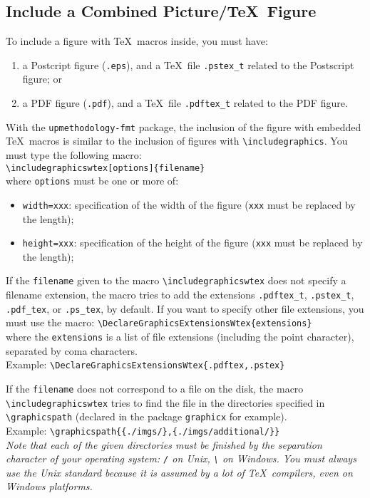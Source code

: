 \documentclass[book]{upmethodology-document}
\begin{document}
\subsection{Include a Combined Picture/\TeX\ Figure}

To include a figure with \TeX\ macros inside, you must have: \begin{enumerate}
\item a Postcript figure (\texttt{.eps}), and a \TeX\ file \texttt{.pstex\_t} related to the Postscript figure; or
\item a PDF figure (\texttt{.pdf}), and a \TeX\ file \texttt{.pdftex\_t} related to the PDF figure.
\end{enumerate}

With the \texttt{upmethodology-fmt} package, the inclusion of the figure with embedded \TeX\ macros is similar to the inclusion of figures with \texttt{{\textbackslash}includegraphics}. You must type the following macro: \\
\texttt{{\textbackslash}includegraphicswtex[options]\{filename\}} \\
where \texttt{options} must be one or more of: \begin{itemize}
\item \texttt{width=xxx}: specification of the width of the figure (\texttt{xxx} must be replaced by the length);
\item \texttt{height=xxx}: specification of the height of the figure (\texttt{xxx} must be replaced by the length);
\end{itemize}

If the \texttt{filename} given to the macro \texttt{{\textbackslash}includegraphicswtex} does not specify a filename extension, the macro tries to add the extensions \texttt{.pdftex\_t}, \texttt{.pstex\_t}, \texttt{.pdf\_tex}, or \texttt{.ps\_tex}, by default. If you want to specify other file extensions, you must use the macro:
\texttt{{\textbackslash}DeclareGraphicsExtensionsWtex\{extensions\}} \\
where the \texttt{extensions} is a list of file extensions (including the point character), separated by coma characters. \\
Example: \texttt{{\textbackslash}DeclareGraphicsExtensionsWtex\{.pdftex,.pstex\}}

If the \texttt{filename} does not correspond to a file on the disk, the macro \texttt{{\textbackslash}includegraphicswtex} tries to find the file in the directories specified in \texttt{{\textbackslash}graphicspath} (declared in the package \texttt{graphicx} for example). \\
Example: \texttt{{\textbackslash}graphicspath\{\{./imgs/\},\{./imgs/additional/\}\}} \\
\emph{Note that each of the given directories must be finished by the separation character of your operating system: \texttt{/} on Unix, \texttt{\textbackslash} on Windows. You must always use the Unix standard because it is assumed by a lot of \TeX\ compilers, even on Windows platforms.}
\end{document}
